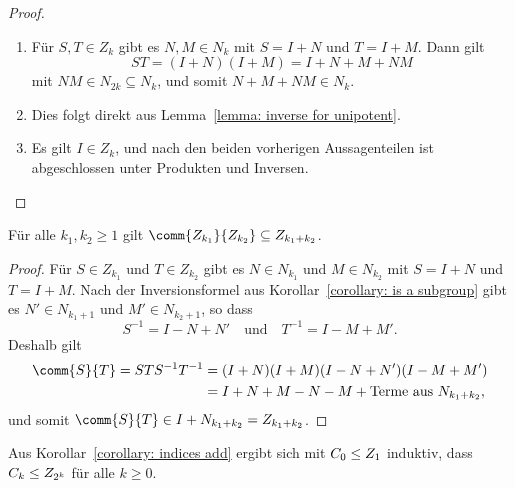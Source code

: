 \begin{proof}
  \leavevmode
  \begin{enumerate}
    \item
      Für $S, T \in Z_k$ gibt es $N, M \in N_k$ mit $S = I + N$ und $T = I + M$.
      Dann gilt
      \[
          S T
        = (I + N)(I + M)
        = I + N + M + NM
      \]
      mit $NM \in N_{2k} \subseteq N_k$, und somit $N + M + NM \in N_k$.
    \item
      Dies folgt direkt aus Lemma~\ref{lemma: inverse for unipotent}.
    \item
      Es gilt $I \in Z_k$, und nach den beiden vorherigen Aussagenteilen ist abgeschlossen unter Produkten und Inversen.
    \qedhere
  \end{enumerate}
\end{proof}

\begin{corollary}
  \label{corollary: indices add}
  Für alle $k_1, k_2 \geq 1$ gilt $\comm{Z_{k_1}}{Z_{k_2}} \subseteq Z_{k_1 + k_2}$.
\end{corollary}

\begin{proof}
  Für $S \in Z_{k_1}$ und $T \in Z_{k_2}$ gibt es $N \in N_{k_1}$ und $M \in N_{k_2}$ mit $S = I + N$ und $T = I + M$.
  Nach der Inversionsformel aus Korollar~\ref{corollary: is a subgroup} gibt es $N' \in N_{k_1 + 1}$ und $M' \in N_{k_2 + 1}$, so dass
  \[
      S^{-1}
    = I - N + N'
    \quad\text{und}\quad
      T^{-1}
    = I - M + M'.
  \]
  Deshalb gilt
  \begin{align*}
        \comm{S}{T}
     =  S T S^{-1} T^{-1}
    &=  (I + N)(I + M)(I - N + N')(I - M + M')
    \\
    &=  I + N + M - N - M + \text{Terme aus $N_{k_1 + k_2}$},
  \end{align*}
  und somit $\comm{S}{T} \in I + N_{k_1 + k_2} = Z_{k_1 + k_2}$.
\end{proof}

Aus Korollar~\ref{corollary: indices add} ergibt sich mit $C_0 \leq Z_1$ induktiv, dass $C_k \leq Z_{2^k}$ für alle $k \geq0$.





